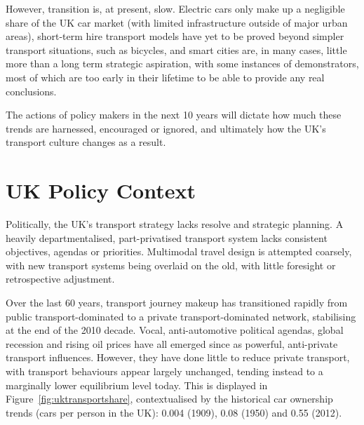 \documentclass[journal]{IEEEtran}
\begin{document}
However, transition is, at present, slow. Electric cars only make up a
negligible share of the UK car market (with limited infrastructure
outside of major urban areas), short-term hire transport models have
yet to be proved beyond simpler transport situations, such as
bicycles, and smart cities are, in many cases, little more than a long
term strategic aspiration, with some instances of demonstrators, most
of which are too early in their lifetime to be able to provide any
real conclusions.

The actions of policy makers in the next 10 years will dictate
how much these trends are harnessed, encouraged or ignored, and
ultimately how the UK's transport culture changes as a result.


\section{UK Policy Context}

Politically, the UK's transport strategy lacks resolve and strategic
planning. A heavily departmentalised, part-privatised transport system
lacks consistent objectives, agendas or priorities. Multimodal travel
design is attempted coarsely, with new transport systems being
overlaid on the old, with little foresight or retrospective
adjustment.

Over the last 60 years, transport journey makeup has transitioned
rapidly from public transport-dominated to a private
transport-dominated network, stabilising at the end of the 2010
decade. Vocal, anti-automotive political agendas, global recession and
rising oil prices have all emerged since as powerful, anti-private
transport influences. However, they have done little to reduce private
transport, with transport behaviours appear largely unchanged, tending
instead to a marginally lower equilibrium level today. This is
displayed in Figure~\ref{fig:uktransportshare}, contextualised by the
historical car ownership trends (cars per person in the UK): 0.004
(1909), 0.08 (1950) and 0.55 (2012).

\end{document}
